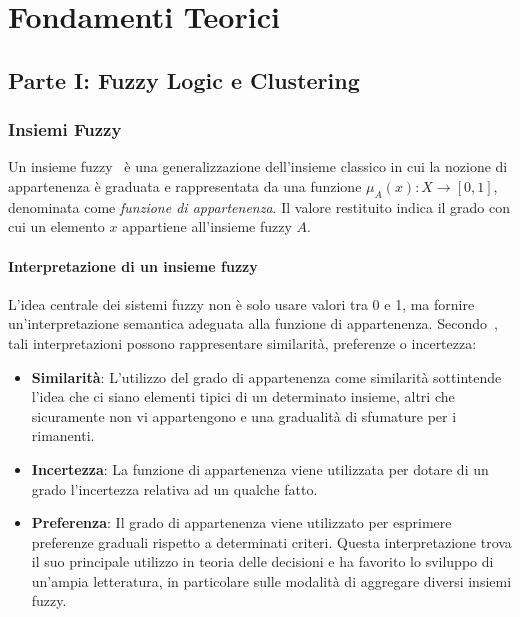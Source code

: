 \chapter{Fondamenti Teorici}
\label{chap:chap2}

\section{Parte I: Fuzzy Logic e Clustering}

\subsection{Insiemi Fuzzy}

Un insieme fuzzy~\cite{Goguen_1973} è una generalizzazione dell'insieme classico in cui la nozione di appartenenza è graduata e rappresentata da una funzione $\mu_A(x): X \rightarrow [0,1]$, denominata come \textit{funzione di appartenenza}. Il valore restituito indica il grado con cui un elemento $x$ appartiene all'insieme fuzzy $A$. 

\subsubsection{Interpretazione di un insieme fuzzy}

L’idea centrale dei sistemi fuzzy non è solo usare valori tra 0 e 1, ma fornire un’interpretazione semantica adeguata alla funzione di appartenenza. Secondo~\cite{DUBOIS1997141}, tali interpretazioni possono rappresentare similarità, preferenze o incertezza:
\begin{itemize}
    \item \textbf{Similarità}: L'utilizzo del grado di appartenenza come similarità sottintende l'idea che ci siano elementi tipici di un determinato insieme, altri che sicuramente non vi appartengono e una gradualità di sfumature per i rimanenti.
    \item \textbf{Incertezza}: La funzione di appartenenza viene utilizzata per dotare di un grado l'incertezza relativa ad un qualche fatto.
    \item \textbf{Preferenza}: Il grado di appartenenza viene utilizzato per esprimere preferenze graduali rispetto a determinati criteri. Questa interpretazione trova il suo principale utilizzo in teoria delle decisioni e ha favorito lo sviluppo di un'ampia letteratura, in particolare sulle modalità di aggregare diversi insiemi fuzzy.
\end{itemize}

